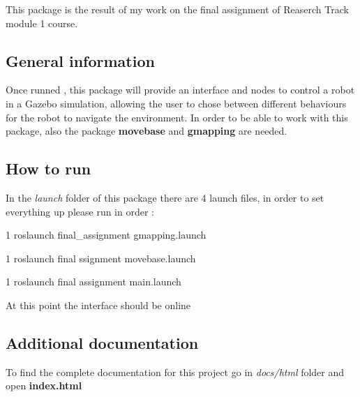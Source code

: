 This package is the result of my work on the final assignment of Reaserch Track module 1 course.

\subsection*{General information}

Once runned , this package will provide an interface and nodes to control a robot in a Gazebo simulation, allowing the user to chose between different behaviours for the robot to navigate the environment. In order to be able to work with this package, also the package {\bfseries movebase} and {\bfseries gmapping} are needed.

\subsection*{How to run}

In the {\itshape launch} folder of this package there are 4 launch files, in order to set everything up please run in order \+:


\begin{DoxyCode}
1 roslaunch final\_assignment gmapping.launch
\end{DoxyCode}
 
\begin{DoxyCode}
1 roslaunch final ssignment movebase.launch
\end{DoxyCode}
 
\begin{DoxyCode}
1 roslaunch final assignment main.launch
\end{DoxyCode}


At this point the interface should be online

\subsection*{Additional documentation}

To find the complete documentation for this project go in {\itshape docs/html} folder and open {\bfseries index.\+html} 